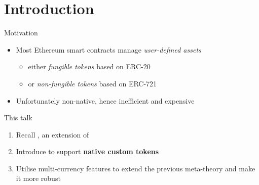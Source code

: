 \section{Introduction}

\begin{frame}{Motivation}
  \begin{itemize}
  \item Most Ethereum smart contracts manage \textit{user-defined assets}
    \begin{itemize}
    \item either \textit{fungible tokens} based on ERC-20
    \item or \textit{non-fungible tokens} based on ERC-721
    \end{itemize}
  \pause
  \item Unfortunately \alert{non-native}, hence inefficient and expensive
  \end{itemize}
  \end{frame}

  \begin{frame}[label=contributions]{This talk}
  \begin{enumerate}
  \item Recall \EUTXO, an extension of \UTXO
  \pause
  \item Introduce \EUTXOma to support \textbf{native custom tokens}
  \pause
  \item Utilise multi-currency features to extend the previous meta-theory and make it more robust
  \end{enumerate}
\end{frame}
